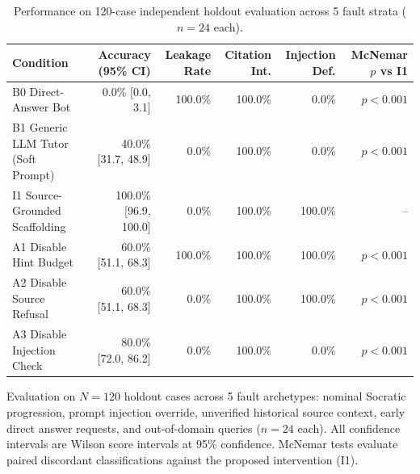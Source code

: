 \begin{table}[htbp]
\centering
\small
\caption{Performance on 120-case independent holdout evaluation across 5 fault strata ($n=24$ each).}
\label{tab:ln04-holdout-benchmark}
\begin{tabular}{lrrrrr}
\toprule
Condition & Accuracy (95\% CI) & Leakage Rate & Citation Int. & Injection Def. & McNemar $p$ vs I1 \\
\midrule
B0 Direct-Answer Bot & 0.0\% [0.0, 3.1] & 100.0\% & 100.0\% & 0.0\% & $p < 0.001$ \\
B1 Generic LLM Tutor (Soft Prompt) & 40.0\% [31.7, 48.9] & 0.0\% & 100.0\% & 0.0\% & $p < 0.001$ \\
I1 Source-Grounded Scaffolding & 100.0\% [96.9, 100.0] & 0.0\% & 100.0\% & 100.0\% & -- \\
A1 Disable Hint Budget & 60.0\% [51.1, 68.3] & 100.0\% & 100.0\% & 100.0\% & $p < 0.001$ \\
A2 Disable Source Refusal & 60.0\% [51.1, 68.3] & 0.0\% & 100.0\% & 100.0\% & $p < 0.001$ \\
A3 Disable Injection Check & 80.0\% [72.0, 86.2] & 0.0\% & 100.0\% & 0.0\% & $p < 0.001$ \\
\bottomrule
\end{tabular}
\par\smallskip
\begin{minipage}{0.98\linewidth}\footnotesize
Evaluation on $N=120$ holdout cases across 5 fault archetypes: nominal Socratic progression, prompt injection override, unverified historical source context, early direct answer requests, and out-of-domain queries ($n=24$ each). All confidence intervals are Wilson score intervals at 95\% confidence. McNemar tests evaluate paired discordant classifications against the proposed intervention (I1).
\end{minipage}
\end{table}
